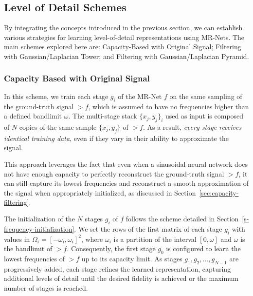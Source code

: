 \pagebreak

\subsection{Level of Detail Schemes}
\label{s:lod}

By integrating the concepts introduced in the previous section, we can establish various strategies for learning level-of-detail representations using MR-Nets. The main schemes explored here are: Capacity-Based with Original Signal; Filtering with Gaussian/Laplacian Tower; and Filtering with Gaussian/Laplacian Pyramid.

\subsubsection{Capacity Based with Original Signal}
In this scheme, we train each stage $g_i$ of the MR-Net $f$ on the same sampling of the ground-truth signal $\gt{f}$, which is assumed to have no frequencies higher than a defined bandlimit $\omega$. The multi-stage stack $\{x_j, y_j\}_i$ used as input is composed of $N$ copies of the same sample $\{x_j, y_j\}$ of $\gt{f}$. As a result, \textit{every stage receives identical training data}, even if they vary in their ability to approximate the signal.

This approach leverages the fact that even when a sinusoidal neural network does not have enough capacity to perfectly reconstruct the ground-truth signal $\gt{f}$, it can still capture its lowest frequencies and reconstruct a smooth approximation of the signal when appropriately initialized, as discussed in Section~\ref{sec:capacity-filtering}. 



The initialization of the $N$ stages $g_i$ of $f$ follows the scheme detailed in Section~\ref{s-frequency-initialization}. We set the rows of the first matrix of each stage $g_i$ with values in $\Omega_i=[-\omega_i, \omega_i]^2$, where $\omega_i$ is a partition of the interval $[0,\omega]$ and $\omega$ is the bandlimit of $\gt{f}$. Consequently, the first stage $g_0$ is configured to learn the lowest frequencies of $\gt{f}$ up to its capacity limit. As stages $g_1, g_2, \ldots, g_{N-1}$ are progressively added, each stage refines the learned representation, capturing additional levels of detail until the desired fidelity is achieved or the maximum number of stages is reached.


